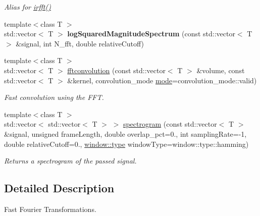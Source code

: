\begin{DoxyCompactItemize}
\begin{DoxyCompactList}\small\item\em Alias for \mbox{\hyperlink{namespacedsp_1_1fft_a3b9c8542f82a31aa5745f9b885d8fdbc}{irfft()}} \end{DoxyCompactList}\item 
\mbox{\label{namespacedsp_1_1fft_a299e141eb0a89c1b69d0c1571c22222a}} 
{\footnotesize template$<$class T $>$ }\\std\+::vector$<$ T $>$ {\bfseries log\+Squared\+Magnitude\+Spectrum} (const std\+::vector$<$ T $>$ \&signal, int N\+\_\+fft, double relative\+Cutoff)
\item 
\mbox{\label{namespacedsp_1_1fft_a167c9e606b663c22f0f39e2296d1377b}} 
{\footnotesize template$<$class T $>$ }\\std\+::vector$<$ T $>$ \mbox{\hyperlink{namespacedsp_1_1fft_a167c9e606b663c22f0f39e2296d1377b}{fftconvolution}} (const std\+::vector$<$ T $>$ \&volume, const std\+::vector$<$ T $>$ \&kernel, convolution\+\_\+mode \mbox{\hyperlink{namespacedsp_a1d4932cf0fd90a0ecde3b2deffeb740c}{mode}}=convolution\+\_\+mode\+::valid)
\begin{DoxyCompactList}\small\item\em Fast convolution using the F\+FT. \end{DoxyCompactList}\item 
{\footnotesize template$<$class T $>$ }\\std\+::vector$<$ std\+::vector$<$ T $>$ $>$ \mbox{\hyperlink{namespacedsp_1_1fft_a1165887d30389fb6565efc597be66ce1}{spectrogram}} (const std\+::vector$<$ T $>$ \&signal, unsigned frame\+Length, double overlap\+\_\+pct=0., int sampling\+Rate=-\/1, double relative\+Cutoff=0., \mbox{\hyperlink{namespacedsp_1_1window_a1cc0dcec4aa9e12640771bdf41f695b8}{window\+::type}} window\+Type=window\+::type\+::hamming)
\begin{DoxyCompactList}\small\item\em Returns a spectrogram of the passed signal. \end{DoxyCompactList}\end{DoxyCompactItemize}


\subsection{Detailed Description}
Fast Fourier Transformations. 


